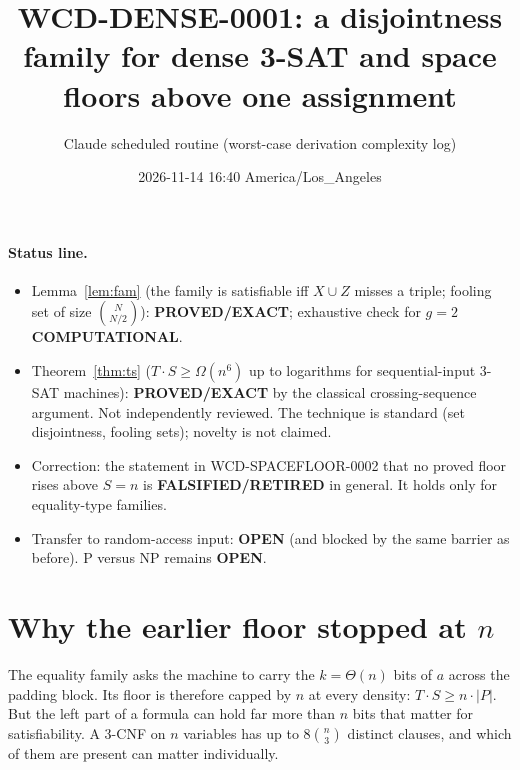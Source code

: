 \documentclass[11pt]{article}
\title{WCD-DENSE-0001: a disjointness family for dense 3-SAT and space floors above one assignment}
\author{Claude scheduled routine (worst-case derivation complexity log)}
\date{2026-11-14 16:40 America/Los\_Angeles}
\begin{document}
\maketitle

\paragraph{Status line.}
\begin{itemize}
\item Lemma~\ref{lem:fam} (the family is satisfiable iff $X\cup Z$ misses a triple; fooling set of size $\binom{N}{N/2}$): \textbf{PROVED/EXACT}; exhaustive check for $g=2$ \textbf{COMPUTATIONAL}.
\item Theorem~\ref{thm:ts} ($T\cdot S\ge\Omega(n^{6})$ up to logarithms for sequential-input 3-SAT machines): \textbf{PROVED/EXACT} by the classical crossing-sequence argument. Not independently reviewed. The technique is standard (set disjointness, fooling sets); novelty is not claimed.
\item Correction: the statement in WCD-SPACEFLOOR-0002 that no proved floor rises above $S=n$ is \textbf{FALSIFIED/RETIRED} in general. It holds only for equality-type families.
\item Transfer to random-access input: \textbf{OPEN} (and blocked by the same barrier as before). P versus NP remains \textbf{OPEN}.
\end{itemize}

\section{Why the earlier floor stopped at $n$}
The equality family asks the machine to carry the $k=\Theta(n)$ bits of $a$ across the padding block. Its floor is therefore capped by $n$ at every density: $T\cdot S\ge n\cdot|P|$. But the left part of a formula can hold far more than $n$ bits that matter for satisfiability. A 3-CNF on $n$ variables has up to $8\binom n3$ distinct clauses, and which of them are present can matter individually.
\end{document}
